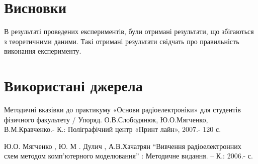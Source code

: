 \section{Висновки}
\indent В результаті проведених експериментів, були отримані результати, що збігаються з теоретичними даними. Такі отримані результати свідчать про правильність виконання експерименту.


\section{Використані джерела}

\qquad Методичні вказівки до практикуму «Основи радіоелектроніки»
для студентів фізичного факультету / Упоряд. О.В.Слободянюк,
Ю.О.Мягченко, В.М.Кравченко.- К.: Поліграфічний центр «Принт
лайн», 2007.- 120 с.

\qquad Ю.О. Мягченко , Ю. М . Дулич , А.В.Хачатрян “Вивчення
радіоелектронних схем методом комп’ютерного моделювання” :
Методичне видання. – К.: 2006.- с.
